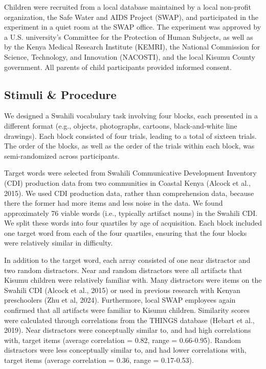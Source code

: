 \documentclass[10pt, letterpaper]{article}
\begin{document}
Children were recruited from a local database maintained by a local
non-profit organization, the Safe Water and AIDS Project (SWAP), and
participated in the experiment in a quiet room at the SWAP office. The
experiment was approved by a U.S. university's Committee for the
Protection of Human Subjects, as well as by the Kenya Medical Research
Institute (KEMRI), the National Commission for Science, Technology, and
Innovation (NACOSTI), and the local Kisumu County government. All
parents of child participants provided informed consent.

\subsection{Stimuli \& Procedure}\label{stimuli-procedure}

We designed a Swahili vocabulary task involving four blocks, each
presented in a different format (e.g., objects, photographs, cartoons,
black-and-white line drawings). Each block consisted of four trials,
leading to a total of sixteen trials. The order of the blocks, as well
as the order of the trials within each block, was semi-randomized across
participants.

Target words were selected from Swahili Communicative Development
Inventory (CDI) production data from two communities in Coastal Kenya
(Alcock et al., 2015). We used CDI production data, rather than
comprehension data, because there the former had more items and less
noise in the data. We found approximately 76 viable words (i.e.,
typically artifact nouns) in the Swahili CDI. We split these words into
four quartiles by age of acquisition. Each block included one target
word from each of the four quartiles, ensuring that the four blocks were
relatively similar in difficulty.

In addition to the target word, each array consisted of one near
distractor and two random distractors. Near and random distractors were
all artifacts that Kisumu children were relatively familiar with. Many
distractors were items on the Swahili CDI (Alcock et al., 2015) or used
in previous research with Kenyan preschoolers (Zhu et al, 2024).
Furthermore, local SWAP employees again confirmed that all artifacts
were familiar to Kisumu children. Similarity scores were calculated
through correlations from the THINGS database (Hebart et al., 2019).
Near distractors were conceptually similar to, and had high correlations
with, target items (average correlation = 0.82, range = 0.66-0.95).
Random distractors were less conceptually similar to, and had lower
correlations with, target items (average correlation = 0.36, range =
0.17-0.53).
\end{document}
